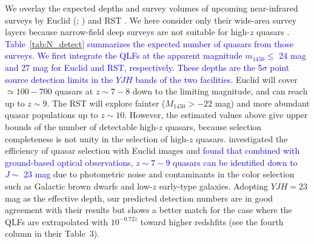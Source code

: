 \documentclass[twocolumn, twocolappendix]{aastex63}
\newcommand{\Muv}{M_{1450}}
\newcommand{\blue}[1]{\textcolor{blue}{ #1}}
\begin{document}
\begin{CJK*}{UTF8}{gbsn}
We overlay the expected depths and survey volumes of upcoming near-infrared surveys by
Euclid (\citealt{2011arXiv1110.3193L}; \citealt{2019Barnett}) and RST \citep{2019arXiv190205569A}.
We here consider only their wide-area survey layers because narrow-field deep surveys are not suitable for high-$z$ quasars \citep[but see][]{2022arXiv220907325O}.
\blue{
Table~\ref{tab:N_detect} summarizes the expected number of quasars from those surveys.
We first integrate the QLFs at the apparent magnitude $m_{1450}\leq$ 24 mag and 27 mag for Euclid and RST, respectively.
These depths are the 5$\sigma$ point source detection limits in the $YJH$ bands of the two facilities.
}
Euclid will cover $\simeq 100-700$ quasars at $z\sim7-8$ down to the limiting magnitude, and can reach up to $z\sim 9$.
The RST will explore fainter ($\Muv>-22$ mag) and more abundant quasar populations up to $z\sim 10$.
However, the estimated values above give upper bounds of the number of detectable high-$z$ quasars,
because selection completeness is not unity in the selection of high-$z$ quasars.
\citet{2019Barnett} investigated the efficiency of quasar selection with Euclid images and
\blue{found that combined with ground-based optical observations,
$z\sim 7-9$ quasars can be identified down to $J \sim$ 23 mag}
due to photometric noise and contaminants in the color selection such as Galactic brown dwarfs and low-$z$ early-type galaxies.
Adopting $YJH=23$ mag as the effective depth, %
our predicted detection numbers are in good agreement with their results but shows a better match for the case
where the QLFs are extrapolated with $10^{-0.72z}$ toward higher redshfits
(see the fourth column in their Table~3).


\end{CJK*}
\end{document}
